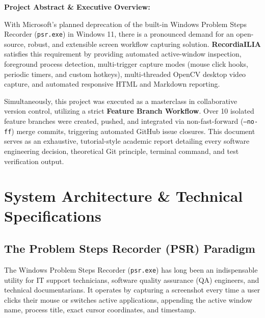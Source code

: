 \documentclass[10pt,a4paper]{article}
\begin{document}
\vspace{1.5em}

\begin{tcolorbox}[colback=lightgray,colframe=lightgray,arc=2mm,left=8pt,right=8pt,top=6pt,bottom=6pt]
    \textbf{\color{darkslate}Project Abstract \& Executive Overview:}\\[0.3em]
    {\small With Microsoft's planned deprecation of the built-in Windows Problem Steps Recorder (\texttt{psr.exe}) in Windows 11, there is a pronounced demand for an open-source, robust, and extensible screen workflow capturing solution. \textbf{RecordiaILIA} satisfies this requirement by providing automated active-window inspection, foreground process detection, multi-trigger capture modes (mouse click hooks, periodic timers, and custom hotkeys), multi-threaded OpenCV desktop video capture, and automated responsive HTML and Markdown reporting.

    Simultaneously, this project was executed as a masterclass in collaborative version control, utilizing a strict \textbf{Feature Branch Workflow}. Over 10 isolated feature branches were created, pushed, and integrated via non-fast-forward (\texttt{--no-ff}) merge commits, triggering automated GitHub issue closures. This document serves as an exhaustive, tutorial-style academic report detailing every software engineering decision, theoretical Git principle, terminal command, and test verification output.}
\end{tcolorbox}

\vspace{1.5em}
\tableofcontents
\newpage

\section{System Architecture \& Technical Specifications}
\subsection{The Problem Steps Recorder (PSR) Paradigm}
The Windows Problem Steps Recorder (\texttt{psr.exe}) has long been an indispensable utility for IT support technicians, software quality assurance (QA) engineers, and technical documentarians. It operates by capturing a screenshot every time a user clicks their mouse or switches active applications, appending the active window name, process title, exact cursor coordinates, and timestamp.
\end{document}
